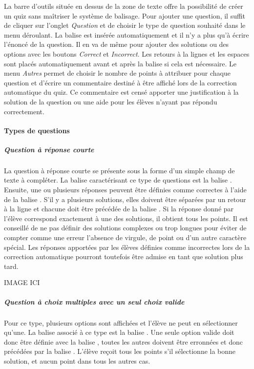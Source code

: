 \documentclass[a4,10pt,french]{sphinxmanual}
\begin{document}
La barre d'outils située en dessus de la zone de texte offre la possibilité de créer un quiz sans maîtriser le système de balisage. Pour ajouter une question, il suffit de cliquer sur l'onglet \emph{Question} et de choisir le type de question souhaité dans le menu déroulant. La balise est insérée automatiquement et il n'y a plus qu'à écrire l'énoncé de la question. Il en va de même pour ajouter des solutions ou des options avec les boutons \emph{Correct} et \emph{Incorrect}. Les retours à la lignes et les espaces sont placés automatiquement avant et après la balise si cela est nécessaire. Le menu \emph{Autres} permet de choisir le nombre de points à attribuer pour chaque question et d'écrire un commentaire destiné à être affiché lors de la correction automatique du quiz. Ce commentaire est censé apporter une justification à la solution de la question ou une aide pour les élèves n'ayant pas répondu correctement.


\paragraph{Types de questions}
\label{doc-user:types-de-questions}

\subparagraph{Question à réponse courte}
\label{doc-user:question-a-reponse-courte}
La question à réponse courte se présente sous la forme d'un simple champ de texte à compléter. La balise caractérisant ce type de questions est la balise . Ensuite, une ou plusieurs réponses peuvent être définies comme correctes à l'aide de la balise \code{=}. S'il y a plusieurs solutions, elles doivent être séparées par un retour à la ligne et chacune doit être précédée de la balise \code{=}. Si la réponse donné par l'élève correspond exactement à une des solutions, il obtient tous les points. Il est conseillé de ne pas définir des solutions complexes ou trop longues pour éviter de compter comme une erreur l'absence de virgule, de point ou d'un autre caractère spécial. Les réponses apportées par les élèves définies comme incorrectes lors de la correction automatique pourront toutefois être admise en tant que solution plus tard.

IMAGE ICI


\subparagraph{Question à choix multiples avec un seul choix valide}
\label{doc-user:question-a-choix-multiples-avec-un-seul-choix-valide}
Pour ce type, plusieurs options sont affichées et l'élève ne peut en sélectionner qu'une. La balise associé à ce type est la balise \code{**}. Une seule option valide doit donc être définie avec la balise \code{=}, toutes les autres doivent être erronnées et donc précédées par la balise \code{*}. L'élève reçoit tous les points s'il sélectionne la bonne solution, et aucun point dans tous les autres cas.
\end{document}
